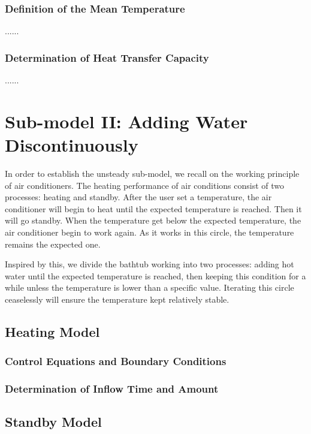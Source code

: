 \documentclass{mcmthesis}
\begin{document}
\subsubsection{Definition of the Mean Temperature}

......

\subsubsection{Determination of Heat Transfer Capacity}

......

\section{Sub-model II: Adding Water Discontinuously}

In order to establish the unsteady sub-model, we recall on the working principle of air conditioners. The heating performance of air conditions consist of two processes: heating and standby. After the user set a temperature, the air conditioner will begin to heat until the expected temperature is reached. Then it will go standby. When the temperature get below the expected temperature, the air conditioner begin to work again. As it works in this circle, the temperature remains the expected one.

Inspired by this, we divide the bathtub working into two processes: adding
hot water until the expected temperature is reached, then keeping this
condition for a while unless the temperature is lower than a specific value. Iterating this circle ceaselessly will ensure the temperature kept relatively stable.

\subsection{Heating Model}

\subsubsection{Control Equations and Boundary Conditions}

\subsubsection{Determination of Inflow Time and Amount}

\subsection{Standby Model}
\end{document}
